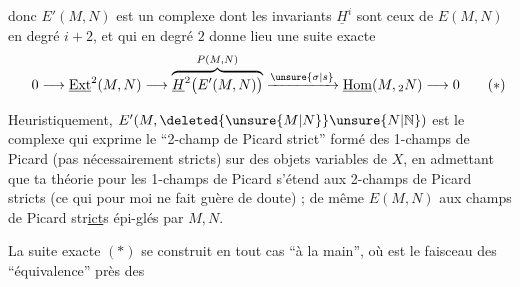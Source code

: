 
donc $E'(M,N)$ est un complexe dont les invariants $\underline{H}^{i}$ sont ceux de $E(M,N)$ en degré $i+2$, et qui en degré $2$ donne lieu  une suite exacte
\[
0\longrightarrow\underline{\mathrm{Ext}}^{2}(M,N)\longrightarrow
\overbrace{\underline{H}^{2}\bigl(E'(M,N)\bigr)}^{P(M,N)}
\xrightarrow{\unsure{\sigma|s}}\underline{\mathrm{Hom}}(M,{}_{2}N)\longrightarrow 0
\tag*{\makebox[0pt][r]{\makebox[\displaywidth][l]{$(*)$}}}
\]

Heuristiquement, $E'(M,\deleted{\unsure{M|N}}\unsure{N|\mathbb{N}})$ est le complexe qui exprime le ``2-champ de Picard strict'' formé des 1-champs de Picard (pas nécessairement stricts)  sur des objets variables de $X$, en admettant que ta théorie pour les 1-champs de Picard  s'étend aux 2-champs de Picard stricts (ce qui pour moi ne fait guère de doute) ; de même $E(M,N)$  aux champs de Picard str\uline{ict}s épi-glés par $M,N$.

La suite exacte $(*)$ se construit en tout cas  ``à la main'', où    est le faisceau des    ``équivalence'' près des

